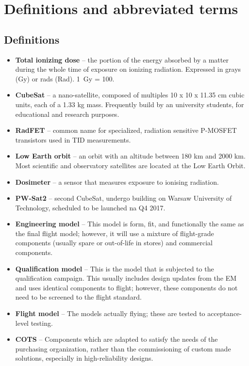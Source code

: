 \chapter{Definitions and abbreviated terms}

\section{Definitions}
\begin{itemize}
    \item \textbf{Total ionizing dose} -- the portion of the energy absorbed by a matter during the whole time of exposure on ionizing radiation. \cite{RadFET_PhD} Expressed in grays (Gy) or rads (Rad). \SI{1}{Gy} = \SI{100}{\rad}.

    \item \textbf{CubeSat} -- a nano-satellite, composed of multiples 10 x 10 x 11.35 cm cubic units, each of a 1.33 kg mass. Frequently build by an university students, for educational and research purposes. \cite{CDS}

    \item \textbf{RadFET} -- common name for specialized, radiation sensitive P-MOSFET transistors used in TID measurements.

    \item \textbf{Low Earth orbit} -- an orbit with an altitude between 180 km and 2000 km. Most scientific and observatory satellites are located at the Low Earth Orbit. \cite{NASA_orbits}

    \item \textbf{Dosimeter} -- a sensor that measures exposure to ionising radiation.

    \item \textbf{PW-Sat2} -- second CubeSat, undergo building on Warsaw University of Technology, scheduled to be launched na Q4 2017.

    \item \textbf{Engineering model} -- This model is form, fit, and functionally the same as the final flight model; however, it will use a mixture of flight-grade components (usually spare or out-of-life in stores) and commercial components. \cite{Models_space}

    \item \textbf{Qualification model} -- This is the model that is subjected to the qualification campaign. This usually includes design updates from the EM and uses identical components to flight; however, these components do not need to be screened to the flight standard. \cite{Models_space}

    \item \textbf{Flight model} -- The models actually flying; these are tested to acceptance-level testing. \cite{Models_space}

    \item \textbf{COTS} --  Components which are adapted to satisfy the needs of the purchasing organization, rather than the commissioning of custom made solutions, especially in high-reliability designs.

\end{itemize}

